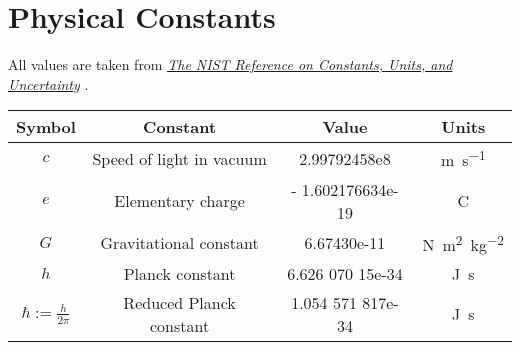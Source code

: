 \section{Physical Constants}
All values are taken from \href{https://physics.nist.gov/cuu/Constants/index.html}{\emph{The NIST Reference on Constants, Units, and Uncertainty}} \cite{NIST-const}.
\begin{table}[htbp]
  \centering
  \begin{tabular}{ccS[table-format=+1.9e+2]c}
    \toprule
    \textbf{Symbol}           & \textbf{Constant}        & {\textbf{Value}}  & \textbf{Units}                                  \\
    \midrule
    $c$                       & Speed of light in vacuum & 2.99792458e8      & \si{\meter\per\second}                          \\
    $e$                       & Elementary charge        & - 1.602176634e-19 & \si{\coulomb}                                   \\
    $G$                       & Gravitational constant   & 6.67430e-11       & \si{\newton\meter\squared\per\kilogram\squared} \\
    $h$                       & Planck constant          & 6.626 070 15e-34  & \si{\joule\second}                              \\
    $\hbar := \frac{h}{2\pi}$ & Reduced Planck constant  & 1.054 571 817e-34 & \si{\joule\second}                              \\
    \bottomrule
  \end{tabular}
\end{table}